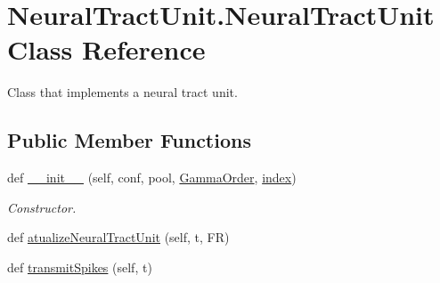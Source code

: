 \hypertarget{class_neural_tract_unit_1_1_neural_tract_unit}{}\section{Neural\+Tract\+Unit.\+Neural\+Tract\+Unit Class Reference}
\label{class_neural_tract_unit_1_1_neural_tract_unit}


Class that implements a neural tract unit.  


\subsection*{Public Member Functions}
\begin{DoxyCompactItemize}
\item 
def \hyperlink{class_neural_tract_unit_1_1_neural_tract_unit_a753c43210f21cae7108504a538e87268}{\+\_\+\+\_\+init\+\_\+\+\_\+} (self, conf, pool, \hyperlink{class_neural_tract_unit_1_1_neural_tract_unit_aee01a134ce97127783d75757ec15f352}{Gamma\+Order}, \hyperlink{class_neural_tract_unit_1_1_neural_tract_unit_ae98dd2328b661ea541f81a8b4c259557}{index})
\begin{DoxyCompactList}\small\item\em Constructor. \end{DoxyCompactList}\item 
def \hyperlink{class_neural_tract_unit_1_1_neural_tract_unit_a30ea40e013697346cae35a342640a6e4}{atualize\+Neural\+Tract\+Unit} (self, t, FR)
\item 
def \hyperlink{class_neural_tract_unit_1_1_neural_tract_unit_a6244f11e9aae2d31066e020f9421a9d8}{transmit\+Spikes} (self, t)
\end{DoxyCompactItemize}
